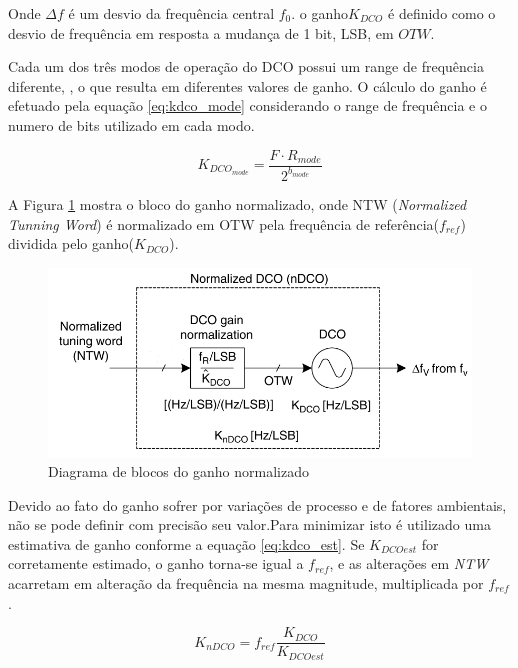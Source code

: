 Onde $\Delta f$ é um desvio da frequência central $f_0$. o ganho$K_{DCO}$ é definido como o desvio de frequência em resposta a mudança de 1 bit, LSB, em $OTW$. 

Cada um dos três modos de operação do DCO possui um range de frequência diferente, , o que resulta em diferentes valores de ganho.  O cálculo do ganho é efetuado pela equação \ref{eq:kdco_mode} considerando o range de frequência e o numero de bits utilizado em cada modo.




\begin{equation}
	K_{DCO_{mode}}= \frac{F \cdot R_{mode}}{2^{b_{mode}}}
	\label{eq:kdco_mode}
\end{equation}

A Figura \ref{fig:ndco} mostra o bloco do ganho normalizado, onde  NTW (\textit{Normalized Tunning Word}) é normalizado em OTW pela frequência de referência($f_{ref}$) dividida pelo ganho($	K_{DCO}$).

\begin{figure}[h!]
	\caption{Diagrama de blocos do ganho normalizado }
	\begin{center}
		\includegraphics[scale=0.8]{img/ndco.png}
	\end{center}
	\label{fig:ndco}
\end{figure}

Devido ao fato do ganho sofrer por variações de processo e de fatores ambientais, não se pode definir com precisão seu valor.Para minimizar isto é utilizado uma estimativa de ganho conforme a equação \ref{eq:kdco_est}. Se  $K_{DCOest}$ for corretamente estimado, o ganho torna-se igual a $f_{ref}$, e as alterações em \textit{NTW} acarretam em alteração da frequência na mesma magnitude, multiplicada por $f_{ref}$.

\begin{equation}
	K_{nDCO}=  f_{ref}\frac{K_{DCO}}{K_{DCOest}}
	\label{eq:kdco_est}
\end{equation}


